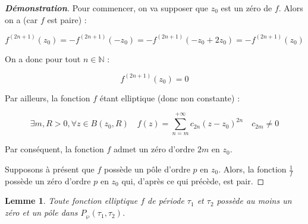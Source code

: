 \documentclass[12pt]{article}
\newtheorem{lemma}{Lemme}
\begin{document}
                    \begin{proof}[\textbf{Démonstration}] 
                    Pour commencer, on va supposer que \(z_0\) est un zéro de \(f\). Alors on a (car \(f\) est paire) :
                    
                    \[
                    f^{(2n+1)}(z_0) = -f^{(2n+1)}(-z_0) = -f^{(2n+1)}(-z_0 + 2z_0) = -f^{(2n+1)}(z_0)
                    \]
                    
                    On a donc pour tout \(n \in \mathbb{N}\) :
                    
                    \[
                    f^{(2n+1)}(z_0) = 0
                    \]
                    
                    Par ailleurs, la fonction \(f\) étant elliptique (donc non constante) :
                    
                    \[
                    \exists m, R > 0, \forall z \in B(z_0, R) \quad f(z) = \sum_{n=m}^{+\infty} c_{2n} (z - z_0)^{2n} \quad c_{2m} \neq 0
                    \]
                    
                    Par conséquent, la fonction \(f\) admet un zéro d'ordre \(2m\) en \(z_0\).
                    
                    Supposons à présent que \(f\) possède un pôle d'ordre \(p\) en \(z_0\). Alors, la fonction \(\frac{1}{f}\) possède un zéro d'ordre \(p\) en \(z_0\) qui, d'après ce qui précède, est pair.
                    \end{proof}
                    
                    \begin{lemma}
                    Toute fonction elliptique \(f\) de période \(\tau_1\) et \(\tau_2\) possède au moins un zéro et un pôle dans \(P_{\wp}(\tau_1, \tau_2)\).
                    \end{lemma}
                    
\end{document}
